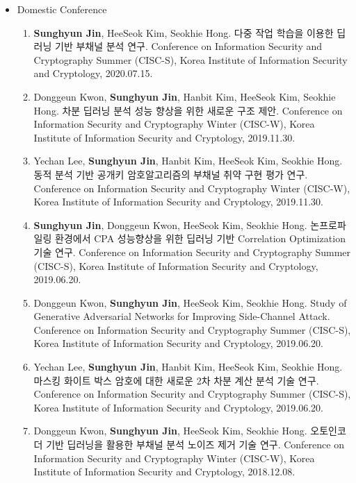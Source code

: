 \documentclass[a4paper,20pt]{article}
\begin{document}
\begin{itemize}
    \item {Domestic Conference}
        \vspace{-6pt}
        \begin{enumerate}
            \item {\textbf{Sunghyun Jin}, HeeSeok Kim, Seokhie Hong. 다중 작업 학습을 이용한 딥러닝 기반 부채널 분석 연구. Conference on Information Security and Cryptography Summer (CISC-S), Korea Institute of Information Security and Cryptology, 2020.07.15.}
            \vspace{-2pt}
            \item {Donggeun Kwon, \textbf{Sunghyun Jin}, Hanbit Kim, HeeSeok Kim, Seokhie Hong. 차분 딥러닝 분석 성능 향상을 위한 새로운 구조 제안. Conference on Information Security and Cryptography Winter (CISC-W), Korea Institute of Information Security and Cryptology, 2019.11.30.}
            \vspace{-2pt}
            \item {Yechan Lee, \textbf{Sunghyun Jin}, Hanbit Kim, HeeSeok Kim, Seokhie Hong. 동적 분석 기반 공개키 암호알고리즘의 부채널 취약 구현 평가 연구. Conference on Information Security and Cryptography Winter (CISC-W), Korea Institute of Information Security and Cryptology, 2019.11.30.}
            \vspace{-2pt}
            \item {\textbf{Sunghyun Jin}, Donggeun Kwon, HeeSeok Kim, Seokhie Hong. 논프로파일링 환경에서 CPA 성능향상을 위한 딥러닝 기반 Correlation Optimization 기술 연구. Conference on Information Security and Cryptography Summer (CISC-S), Korea Institute of Information Security and Cryptology, 2019.06.20.}
            \vspace{-2pt}
            \item {Donggeun Kwon, \textbf{Sunghyun Jin}, HeeSeok Kim, Seokhie Hong. Study of Generative Adversarial Networks for Improving Side-Channel Attack. Conference on Information Security and Cryptography Summer (CISC-S), Korea Institute of Information Security and Cryptology, 2019.06.20.}
            \vspace{-2pt}
            \item {Yechan Lee, \textbf{Sunghyun Jin}, Hanbit Kim, HeeSeok Kim, Seokhie Hong. 마스킹 화이트 박스 암호에 대한 새로운 2차 차분 계산 분석 기술 연구. Conference on Information Security and Cryptography Summer (CISC-S), Korea Institute of Information Security and Cryptology, 2019.06.20.}
            \vspace{-2pt}
            \item {Donggeun Kwon, \textbf{Sunghyun Jin}, HeeSeok Kim, Seokhie Hong. 오토인코더 기반 딥러닝을 활용한 부채널 분석 노이즈 제거 기술 연구. Conference on Information Security and Cryptography Winter (CISC-W), Korea Institute of Information Security and Cryptology, 2018.12.08.}
            \vspace{-2pt}
        \end{enumerate}
        

\end{itemize}
\end{document}
